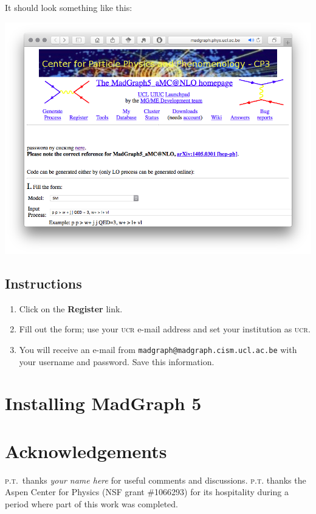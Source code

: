 \documentclass[12pt]{article}
\numberwithin{equation}{section}    %
\newcommand{\acro}[1]{\textsc{\MakeLowercase{#1}}}
\begin{document}
It should look something like this:

\includegraphics[width=.8\textwidth]{MG5website.png}

\subsection{Instructions}
\begin{enumerate}
	\item Click on the \textbf{Register} link.
	\item Fill out the form; use your \acro{UCR} e-mail address and set your institution as \acro{UCR}.
	\item You will receive an e-mail from \texttt{madgraph@madgraph.cism.ucl.ac.be} with your username and password. Save this information.
\end{enumerate}


\section{Installing MadGraph 5}




\section*{Acknowledgements}


%
\textsc{p.t.}\ thanks 
\emph{your name here}
for useful comments and discussions. 
%
\textsc{p.t.} thanks the Aspen Center for Physics (NSF grant \#1066293) for its hospitality during a period where part of this work was completed.



% 
\end{document}
